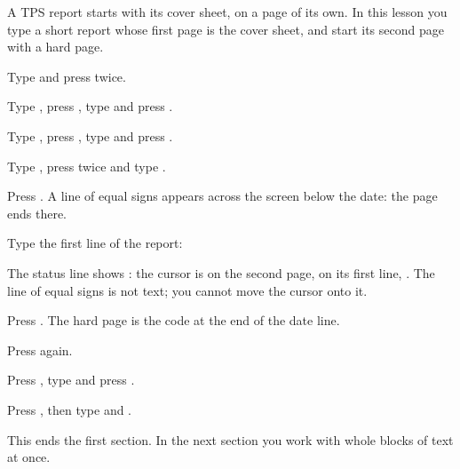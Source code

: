A TPS report starts with its cover sheet, on a page of its own.  In this
lesson you type a short report whose first page is the cover sheet, and
start its second page with a hard page.

\begin{WPSteps}
\item Type  and press  twice.
\item Type , press , type
 and press .
\item Type , press , type
 and press .
\item Type , press  twice and type
.
\end{WPSteps}

\begin{WPSteps}
\item Press .  A line of equal signs appears across the
screen below the date: the page ends there.
\item Type the first line of the report:
\end{WPSteps}
The status line shows : the cursor is on the second page, on its
first line, .  The line of equal signs is not text; you cannot
move the cursor onto it.

\begin{WPSteps}
\item Press .  The hard page is the code
\Code{[HPg]} at the end of the date line.
\end{WPSteps}
\begin{WPSteps}[resume]
\item Press  again.
\end{WPSteps}

\begin{WPSteps}[resume]
\item Press , type  and press
.
\item Press , then type  and .
\end{WPSteps}
\EndReplay
This ends the first section.  In the next section you work with whole blocks
of text at once.
